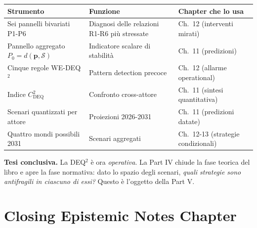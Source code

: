{\def\LTcaptype{none} %
{\small\begin{longtable}[]{@{}
  >{\raggedright\arraybackslash}p{}
  >{\raggedright\arraybackslash}p{}
  >{\raggedright\arraybackslash}p{}@{}}
\toprule\noalign{}
\begin{minipage}[b]{\linewidth}\raggedright
Strumento
\end{minipage} & \begin{minipage}[b]{\linewidth}\raggedright
Funzione
\end{minipage} & \begin{minipage}[b]{\linewidth}\raggedright
Chapter che lo usa
\end{minipage} \\
\midrule\noalign{}
\endhead
\bottomrule\noalign{}
\endlastfoot
Sei pannelli bivariati P1-P6 & Diagnosi delle relazioni R1-R6 più
stressate & Ch.~12 (interventi mirati) \\
Pannello aggregato \(P_0 = d(\boldsymbol{p}, \mathcal{S})\) & Indicatore
scalare di stabilità & Ch.~11 (predizioni) \\
Cinque regole WE-DEQ$^2$ & Pattern detection precoce & Ch.~12 (allarme
operational) \\
Indice \(C_{\text{DEQ}}^2\) & Confronto cross-attore & Ch.~11 (sintesi
quantitativa) \\
Scenari quantizzati per attore & Proiezioni 2026-2031 & Ch.~11
(predizioni datate) \\
Quattro mondi possibili 2031 & Scenari aggregati & Ch.~12-13 (strategie
condizionali) \\
\end{longtable}}
}

\Hypoth{} \textbf{Tesi conclusiva.} La DEQ$^2$ è ora \emph{operativa}. La
Part IV chiude la fase teorica del libro e apre la fase normativa: dato
lo spazio degli scenari, \emph{quali strategie sono antifragili in
ciascuno di essi?} Questo è l'oggetto della Part V.



\section{Closing Epistemic Notes
Chapter}\label{note-epistemiche-di-chiusura-chapter}


